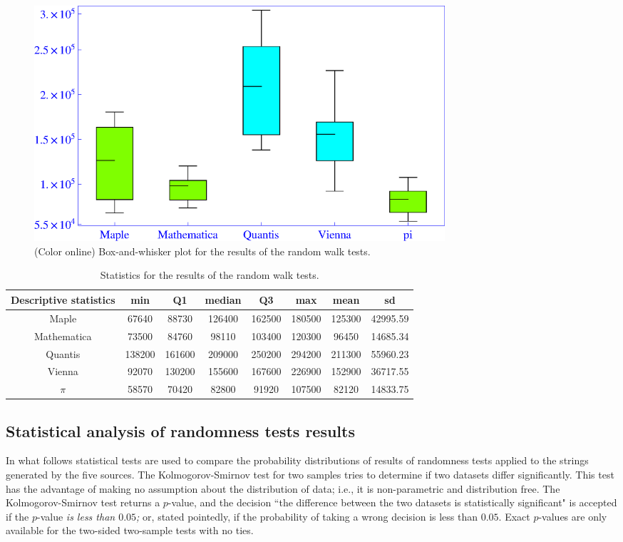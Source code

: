 \documentclass[%
 preprint,
 showpacs,
 showkeys,
 preprintnumbers,
 amsmath,amssymb,
 aps,
 prl,
  longbibliography,
 ]{revtex4-1}
\begin{document}
\begin{figure}[htbp] %
   \centering
   \includegraphics[width=6in]{2009-QvPR-boxrandomwalk}
   \caption{(Color online) Box-and-whisker plot for the results of the random walk tests.}
   \label{fig:example5}
\end{figure}

\begin{table}
\caption{Statistics for the results of the random walk tests.}\label{tab:5}
\begin{center}
\begin{tabular}
[c]{ c c c c c c c c }%
\hline\hline
Descriptive statistics & min & Q1 & median & Q3 & max & mean & sd\\\hline
Maple & 67640 & 88730 & 126400 & 162500 & 180500 & 125300 & 42995.59\\
Mathematica & 73500 & 84760 & 98110 & 103400 & 120300 & 96450 & 14685.34\\
Quantis  & 138200 & 161600 & 209000 & 250200 & 294200 & 211300 & 55960.23\\
Vienna & 92070 & 130200 & 155600 & 167600 & 226900 & 152900 & 36717.55\\
$\pi$ & 58570 & 70420 & 82800 & 91920 & 107500 & 82120 & 14833.75\\\hline\hline
\end{tabular}
\end{center}
\end{table}

\subsection{Statistical analysis of randomness tests results}

In what follows statistical tests are used to compare the probability
distributions of results of randomness tests applied to the strings generated by the
five sources.
The Kolmogorov-Smirnov test  for two samples \cite{Conover}
tries to determine if two datasets differ significantly.
This test
has the advantage of making no assumption about the distribution of data; i.e., it
is non-parametric and distribution free.
The Kolmogorov-Smirnov test returns a $p$-value,
and the decision ``the difference between the two datasets is statistically
significant" is accepted if the $p$-value {\em is less than $0.05$;}
or, stated pointedly, if the
probability of taking a wrong decision is less than $0.05$. Exact $p$-values are
only available for the two-sided two-sample tests with no ties.
\end{document}
